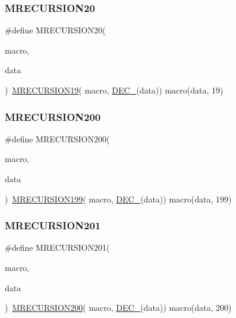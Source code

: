 \subsubsection{\texorpdfstring{MRECURSION20}{MRECURSION20}}
{\footnotesize\ttfamily \#define M\+R\+E\+C\+U\+R\+S\+I\+O\+N20(\begin{DoxyParamCaption}\item[{}]{macro,  }\item[{}]{data }\end{DoxyParamCaption})~\mbox{\hyperlink{group__group__sam0__utils__mrecursion_ga27660e09d1b9282813ab1df951daf01e}{M\+R\+E\+C\+U\+R\+S\+I\+O\+N19}}(  macro, \mbox{\hyperlink{group__group__sam0__utils__mrecursion_ga1d23d683797679dca8c3512a54a5dcae}{D\+E\+C\+\_\+}}(data))   macro(data, 19)}

\mbox{\label{group__group__sam0__utils__mrecursion_ga813c3af979e8abfb90f9ca68f7f58a78}} 
\subsubsection{\texorpdfstring{MRECURSION200}{MRECURSION200}}
{\footnotesize\ttfamily \#define M\+R\+E\+C\+U\+R\+S\+I\+O\+N200(\begin{DoxyParamCaption}\item[{}]{macro,  }\item[{}]{data }\end{DoxyParamCaption})~\mbox{\hyperlink{group__group__sam0__utils__mrecursion_gae1ce17a67961e22bff5e4b9e20f128f0}{M\+R\+E\+C\+U\+R\+S\+I\+O\+N199}}(  macro, \mbox{\hyperlink{group__group__sam0__utils__mrecursion_ga1d23d683797679dca8c3512a54a5dcae}{D\+E\+C\+\_\+}}(data))   macro(data, 199)}

\mbox{\label{group__group__sam0__utils__mrecursion_gae71cc85e09f54c620d59f8d24adae37f}} 
\subsubsection{\texorpdfstring{MRECURSION201}{MRECURSION201}}
{\footnotesize\ttfamily \#define M\+R\+E\+C\+U\+R\+S\+I\+O\+N201(\begin{DoxyParamCaption}\item[{}]{macro,  }\item[{}]{data }\end{DoxyParamCaption})~\mbox{\hyperlink{group__group__sam0__utils__mrecursion_ga813c3af979e8abfb90f9ca68f7f58a78}{M\+R\+E\+C\+U\+R\+S\+I\+O\+N200}}(  macro, \mbox{\hyperlink{group__group__sam0__utils__mrecursion_ga1d23d683797679dca8c3512a54a5dcae}{D\+E\+C\+\_\+}}(data))   macro(data, 200)}

